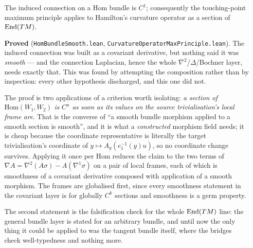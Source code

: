 \begin{lemma}
  \label{lem:hom-bundle-smooth}
  \leanok
  The induced connection on a $\mathrm{Hom}$ bundle is $C^1$; consequently the
  touching-point maximum principle applies to Hamilton's curvature operator as a section of
  $\mathrm{End}(TM)$.

  \textbf{Proved} (\texttt{HomBundleSmooth.lean}, \texttt{CurvatureOperatorMaxPrinciple.lean}).
  The induced connection was built as a covariant derivative, but nothing said it was
  \emph{smooth} --- and the connection Laplacian, hence the whole
  $\nabla^2$/$\Delta$/Bochner layer, needs exactly that. This was found by attempting the
  composition rather than by inspection: every other hypothesis discharged, and this one did
  not.

  The proof is two applications of a criterion worth isolating: \emph{a section of
  $\mathrm{Hom}(W_1,W_2)$ is $C^n$ as soon as its values on the source trivialisation's local
  frame are.} That is the converse of ``a smooth bundle morphism applied to a smooth section
  is smooth'', and it is what a \emph{constructed} morphism field needs; it is cheap because
  the coordinate representative is literally the target trivialisation's coordinate of
  $y \mapsto A_y(e_1^{-1}(y)u)$, so no coordinate change survives. Applying it once per
  $\mathrm{Hom}$ reduces the claim to the two terms of
  $\nabla A = \nabla^2(A\sigma) - A(\nabla^1\sigma)$ on a pair of local frames, each of which
  is smoothness of a covariant derivative composed with application of a smooth morphism. The
  frames are globalised first, since every smoothness statement in the covariant layer is for
  globally $C^k$ sections and smoothness is a germ property.

  The second statement is the falsification check for the whole $\mathrm{End}(TM)$ line: the
  general bundle layer is stated for an arbitrary bundle, and until now the only thing it
  could be applied to was the tangent bundle itself, where the bridges check well-typedness
  and nothing more.
\end{lemma}

